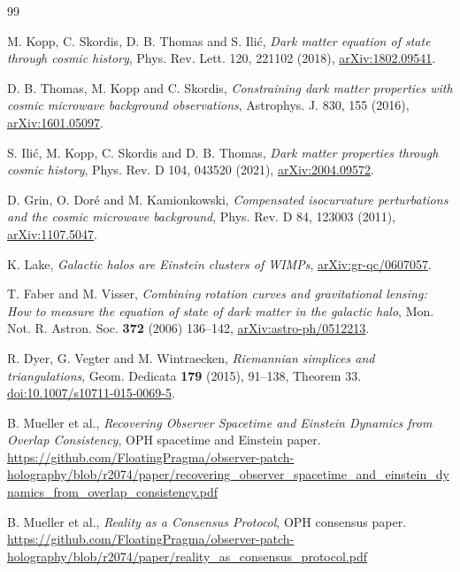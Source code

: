 \documentclass[11pt]{article}
\begin{document}
\begin{thebibliography}{99}

M. Kopp, C. Skordis, D. B. Thomas and S. Ili\'c,
\emph{Dark matter equation of state through cosmic history},
Phys. Rev. Lett. 120, 221102 (2018),
\href{https://arxiv.org/abs/1802.09541}{arXiv:1802.09541}.

D. B. Thomas, M. Kopp and C. Skordis,
\emph{Constraining dark matter properties with cosmic microwave
background observations}, Astrophys. J. 830, 155 (2016),
\href{https://arxiv.org/abs/1601.05097}{arXiv:1601.05097}.

S. Ili\'c, M. Kopp, C. Skordis and D. B. Thomas,
\emph{Dark matter properties through cosmic history},
Phys. Rev. D 104, 043520 (2021),
\href{https://arxiv.org/abs/2004.09572}{arXiv:2004.09572}.

D. Grin, O. Dor\'e and M. Kamionkowski,
\emph{Compensated isocurvature perturbations and the cosmic microwave
background}, Phys. Rev. D 84, 123003 (2011),
\href{https://arxiv.org/abs/1107.5047}{arXiv:1107.5047}.

K. Lake, \emph{Galactic halos are Einstein clusters of WIMPs},
\href{https://arxiv.org/abs/gr-qc/0607057}{arXiv:gr-qc/0607057}.

T. Faber and M. Visser, \emph{Combining rotation curves and gravitational
lensing: How to measure the equation of state of dark matter in the galactic
halo}, Mon. Not. R. Astron. Soc. \textbf{372} (2006) 136--142,
\href{https://arxiv.org/abs/astro-ph/0512213}{arXiv:astro-ph/0512213}.

R. Dyer, G. Vegter and M. Wintraecken,
\emph{Riemannian simplices and triangulations}, Geom. Dedicata
\textbf{179} (2015), 91--138, Theorem 33.
\href{https://doi.org/10.1007/s10711-015-0069-5}{doi:10.1007/s10711-015-0069-5}.

B. Mueller et al.,
\emph{Recovering Observer Spacetime and Einstein Dynamics from Overlap Consistency},
OPH spacetime and Einstein paper.
\url{https://github.com/FloatingPragma/observer-patch-holography/blob/r2074/paper/recovering_observer_spacetime_and_einstein_dynamics_from_overlap_consistency.pdf}

B. Mueller et al.,
\emph{Reality as a Consensus Protocol},
OPH consensus paper.
\url{https://github.com/FloatingPragma/observer-patch-holography/blob/r2074/paper/reality_as_consensus_protocol.pdf}


\end{thebibliography}
\end{document}
